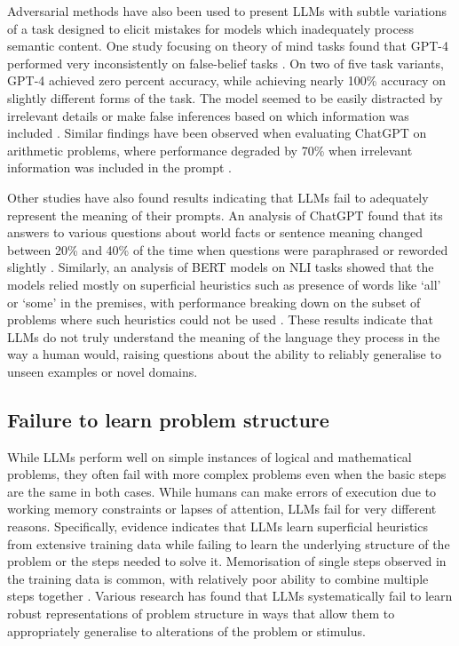 \documentclass{article}
\begin{document}
Adversarial methods have also been used to present LLMs with subtle variations of a task designed to elicit mistakes for models which inadequately process semantic content. One study focusing on theory of mind tasks found that GPT-4 performed very inconsistently on false-belief tasks \citep{shapira2023clever}. On two of five task variants, GPT-4 achieved zero percent accuracy, while achieving nearly 100\% accuracy on slightly different forms of the task. The model seemed to be easily distracted by irrelevant details or make false inferences based on which information was included . Similar findings have been observed when evaluating ChatGPT on arithmetic problems, where performance degraded by 70\% when irrelevant information was included in the prompt \citep{shi2023large}.

Other studies have also found results indicating that LLMs fail to adequately represent the meaning of their prompts. An analysis of ChatGPT found that its answers to various questions about world facts or sentence meaning changed between 20\% and 40\% of the time when questions were paraphrased or reworded slightly \citep{ohmer2024form}. Similarly, an analysis of BERT models on NLI tasks showed that the models relied mostly on superficial heuristics such as presence of words like ‘all’ or ‘some’ in the premises, with performance breaking down on the subset of problems where such heuristics could not be used \citep{gubelmann2022uncovering}. These results indicate that LLMs do not truly understand the meaning of the language they process in the way a human would, raising questions about the ability to reliably generalise to unseen examples or novel domains.

\subsection{Failure to learn problem structure}

While LLMs perform well on simple instances of logical and mathematical problems, they often fail with more complex problems even when the basic steps are the same in both cases. While humans can make errors of execution due to working memory constraints or lapses of attention, LLMs fail for very different reasons. Specifically, evidence indicates that LLMs learn superficial heuristics from extensive training data while failing to learn the underlying structure of the problem or the steps needed to solve it. Memorisation of single steps observed in the training data is common, with relatively poor ability to combine multiple steps together \citep{dziri2024faith}. Various research has found that LLMs systematically fail to learn robust representations of problem structure in ways that allow them to appropriately generalise to alterations of the problem or stimulus.
\end{document}
